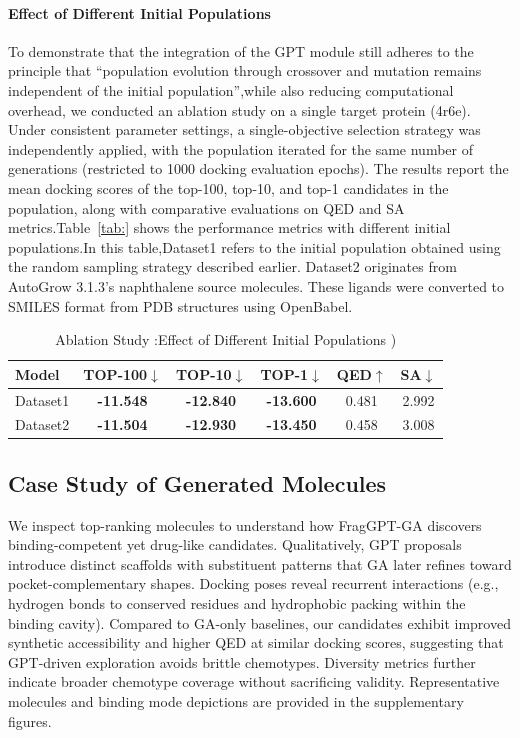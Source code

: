 \documentclass[lettersize,journal]{IEEEtran}
\begin{document}
\paragraph{Effect of Different Initial Populations}
To demonstrate that the integration of the GPT module still adheres to the principle that ``population evolution through crossover and mutation remains independent of the initial population'',while also reducing computational overhead, we conducted an ablation study on a single target protein (4r6e). Under consistent parameter settings, a single-objective selection strategy was independently applied, with the population iterated for the same number of generations (restricted to 1000 docking evaluation epochs). The results report the mean docking scores of the top-100, top-10, and top-1 candidates in the population, along with comparative evaluations on QED and SA metrics.Table~\ref{tab:} shows the performance metrics with different initial populations.In this table,Dataset1 refers to the initial population obtained using the random sampling strategy described earlier. Dataset2 originates from AutoGrow 3.1.3's naphthalene source molecules\cite{durrant2013autogrow}. These ligands were converted to SMILES format from PDB structures using OpenBabel.

\begin{table}[!t]
    \caption{Ablation Study \uppercase\expandafter{}:Effect of Different Initial Populations )
}
    \label{tab:initial populations_ablation}
    \centering    
    \small
    \setlength{\tabcolsep}{4pt}    
    \begin{tabular}{l c c c c c }
        \hline\hline
        Model & TOP-100$\downarrow$ & TOP-10$\downarrow$ & TOP-1$\downarrow$ & QED$\uparrow$ & SA$\downarrow$\\
        \hline
         Dataset1& \textbf{-11.548} & \textbf{-12.840} & \textbf{-13.600} & 0.481 & 2.992  \\
         Dataset2& \textbf{-11.504} & \textbf{-12.930} & \textbf{-13.450} & 0.458 & 3.008  \\
        \hline\hline
    \end{tabular}
\end{table}

\subsection{Case Study of Generated Molecules}
We inspect top-ranking molecules to understand how FragGPT-GA discovers binding-competent yet drug-like candidates. Qualitatively, GPT proposals introduce distinct scaffolds with substituent patterns that GA later refines toward pocket-complementary shapes. Docking poses reveal recurrent interactions (e.g., hydrogen bonds to conserved residues and hydrophobic packing within the binding cavity). Compared to GA-only baselines, our candidates exhibit improved synthetic accessibility and higher QED at similar docking scores, suggesting that GPT-driven exploration avoids brittle chemotypes. Diversity metrics further indicate broader chemotype coverage without sacrificing validity. Representative molecules and binding mode depictions are provided in the supplementary figures.
\end{document}
